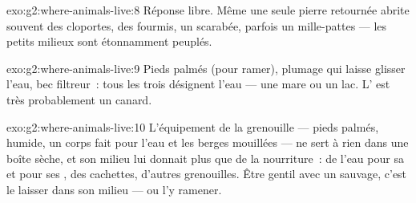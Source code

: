 \begin{solution}{exo:g2:where-animals-live:8}
Réponse libre. Même une seule pierre retournée abrite souvent des
cloportes, des fourmis, un scarabée, parfois un mille-pattes ---
les petits milieux sont étonnamment peuplés.
\end{solution}

\begin{solution}{exo:g2:where-animals-live:9}
Pieds palmés (pour ramer), plumage qui laisse glisser l'eau, bec
filtreur~: tous les trois désignent l'eau --- une mare ou un lac.
L' est très probablement un canard.
\end{solution}

\begin{solution}{exo:g2:where-animals-live:10}
L'équipement de la grenouille --- pieds palmés,  humide, un
corps fait pour l'eau et les berges mouillées --- ne sert à rien
dans une boîte sèche, et son milieu lui donnait plus que de la
nourriture~: de l'eau pour sa  et pour ses , des cachettes,
d'autres grenouilles. Être gentil avec un  sauvage, c'est le
laisser dans son milieu --- ou l'y ramener.
\end{solution}
